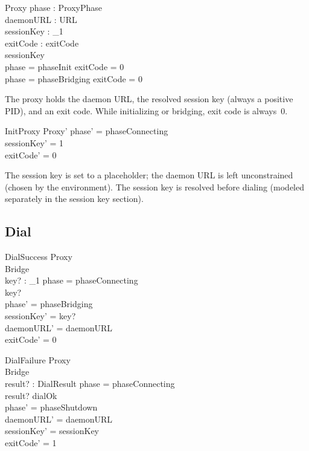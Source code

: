 \documentclass[a4paper,10pt,fleqn]{article}
\begin{document}
\begin{schema}{Proxy}
  phase : ProxyPhase \\
  daemonURL : URL \\
  sessionKey : \nat_1 \\
  exitCode : \nat
  \where
  exitCode  \\
  sessionKey  \\
  phase = phaseInit \implies exitCode = 0 \\
  phase = phaseBridging \implies exitCode = 0
\end{schema}

The proxy holds the daemon URL, the resolved session key (always a
positive PID), and an exit code.  While initializing or bridging, exit
code is always~0.

\begin{schema}{InitProxy}
  Proxy'
  \where
  phase' = phaseConnecting \\
  sessionKey' = 1 \\
  exitCode' = 0
\end{schema}

The session key is set to a placeholder; the daemon URL is left
unconstrained (chosen by the environment).  The session key is
resolved before dialing (modeled separately in the session key
section).

\subsection{Dial}

\begin{schema}{DialSuccess}
  \Delta Proxy \\
  \Xi Bridge \\
  key? : \nat_1
  \where
  phase = phaseConnecting \\
  key?  \\
  phase' = phaseBridging \\
  sessionKey' = key? \\
  daemonURL' = daemonURL \\
  exitCode' = 0
\end{schema}

\begin{schema}{DialFailure}
  \Delta Proxy \\
  \Xi Bridge \\
  result? : DialResult
  \where
  phase = phaseConnecting \\
  result? \neq dialOk \\
  phase' = phaseShutdown \\
  daemonURL' = daemonURL \\
  sessionKey' = sessionKey \\
  exitCode' = 1
\end{schema}
\end{document}
